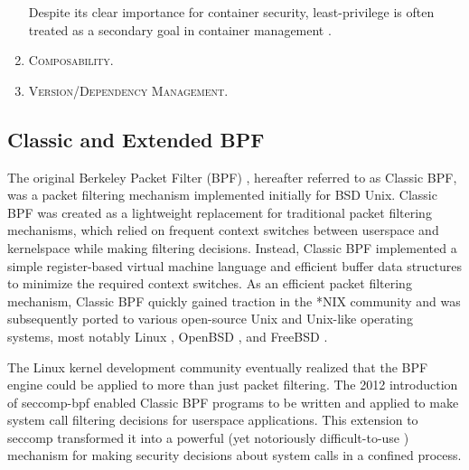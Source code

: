 \begin{enumerate}[label=\bfseries CG\arabic*., ref=CG\arabic*, labelindent=1em]
    Despite its clear importance for container security, least-privilege is often treated as a secondary goal in container management \cite{sultan2019_container_security}.   

  \item \label{item:composability} \textsc{Composability.}

  \item \textsc{Version/Dependency Management.}
\end{enumerate}



\subsection{Classic and Extended BPF}

The original Berkeley Packet Filter (BPF) \cite{mccanne1993_bpf}, hereafter referred to as Classic BPF, was a packet filtering mechanism implemented initially for BSD Unix. Classic BPF was created as a lightweight replacement for traditional packet filtering mechanisms, which relied on frequent context switches between userspace and kernelspace while making filtering decisions. Instead, Classic BPF implemented a simple register-based virtual machine language and efficient buffer data structures to minimize the required context switches. As an efficient packet filtering mechanism, Classic BPF quickly gained traction in the *NIX community and was subsequently ported to various open-source Unix and Unix-like operating systems, most notably Linux \cite{linux_bpf}, OpenBSD \cite{openbsd_bpf}, and FreeBSD \cite{freebsd_bpf}.

The Linux kernel development community eventually realized that the BPF engine could be applied to more than just packet filtering. The 2012 introduction of seccomp-bpf \cite{drewry2012_seccomp_bpf,seccomp_bpf} enabled Classic BPF programs to be written and applied to make system call filtering decisions for userspace applications. This extension to seccomp transformed it into a powerful (yet notoriously difficult-to-use \cite{anderson2017_comparison}) mechanism for making security decisions about system calls in a confined process.

